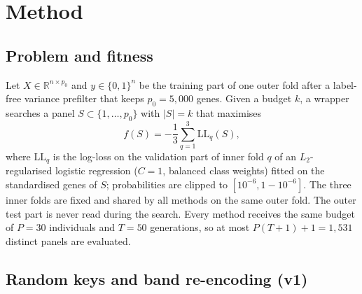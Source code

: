 
\section{Method}\label{sec:method}

\subsection{Problem and fitness}\label{sec:problem}

Let $X\in\mathbb{R}^{n\times p_0}$ and $y\in\{0,1\}^n$ be the training part of one outer fold after a label-free variance
prefilter that keeps $p_0=5{,}000$ genes. Given a budget $k$, a wrapper searches a panel $S\subset\{1,\dots,p_0\}$ with
$|S|=k$ that maximises
\begin{equation}\label{eq:fitness}
  f(S) = -\frac{1}{3}\sum_{q=1}^{3}\mathrm{LL}_q(S),
\end{equation}
where $\mathrm{LL}_q$ is the log-loss on the validation part of inner fold $q$ of an $L_2$-regularised logistic regression
($C=1$, balanced class weights) fitted on the standardised genes of $S$; probabilities are clipped to $[10^{-6},1-10^{-6}]$.
The three inner folds are fixed and shared by all methods on the same outer fold. The outer test part is never read during
the search. Every method receives the same budget of $P=30$ individuals and $T=50$ generations, so at most
$P(T+1)+1=1{,}531$ distinct panels are evaluated.

\subsection{Random keys and band re-encoding (v1)}\label{sec:v1}

